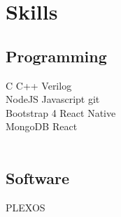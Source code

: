 \documentclass[]{deedy-resume-openfont}
\begin{document}
\begin{minipage}[t]{0.33\textwidth}
\section{Skills}
\vspace{\topsep}
\subsection{Programming}
C \textbullet{} C++ \textbullet{} Verilog \\
NodeJS \textbullet{} Javascript \textbullet{}
git \\
Bootstrap 4 \textbullet{} React Native\\ 
MongoDB  \textbullet{} React \\ \\
\sectionsep

\subsection{Software}
PLEXOS
\sectionsep
%
%

\end{minipage} 
\hfill
\end{document}

